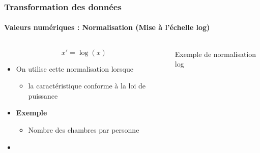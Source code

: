 \documentclass[xcolor=table]{beamer}
\begin{document}
\begin{frame}
	\frametitle{Transformation des données}
	\framesubtitle{Valeurs numériques : Normalisation (Mise à l'échelle log)}
	
	\begin{columns}
		\begin{column}{.5\textwidth}
			
	\[x' = \log(x)	\]
	
	\begin{itemize}
		\item On utilise cette normalisation lorsque
		\begin{itemize}
			\item la caractéristique conforme à la loi de puissance
		\end{itemize}
		\item \textbf{Exemple}
		\begin{itemize}
			\item Nombre des chambres par personne
		\end{itemize}
		\item {}
	\end{itemize}
	\end{column}
	\begin{column}{.5\textwidth}
		
		\begin{center}
			Exemple de normalisation log \cite{2021-google-prep}
		\end{center}
	\end{column}
\end{columns}

\end{frame}
\end{document}
